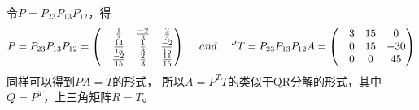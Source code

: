 \documentclass[UTF8,12pt, a4paper]{ctexart}
\begin{document}
  令$P=P_{23}P_{13}P_{12}$，得
  \begin{align*}
    P=P_{23}P_{13}P_{12}=
    \left(
      \begin{matrix}
        &\frac{1}{3} &\frac{-2}{3}  &\frac{2}{3}  \\
        &\frac{14}{15} &\frac{1}{3}  &\frac{-2}{15} \\
        &\frac{-2}{15} &\frac{2}{3} &\frac{11}{15}
      \end{matrix}
    \right)
    \ \ \ \  and \ \ \ \ `'
    T=P_{23}P_{13}P_{12}A=
    \left(
      \begin{matrix}
        &3 &15  &0  \\
        &0 &15 &-30 \\
        &0 &0 &45
      \end{matrix}
    \right)
  \end{align*}
  同样可以得到$PA=T$的形式，
  所以$A=P^TT$的类似于QR分解的形式，其中$Q=P^T$，上三角矩阵$R=T$。
\end{document}
